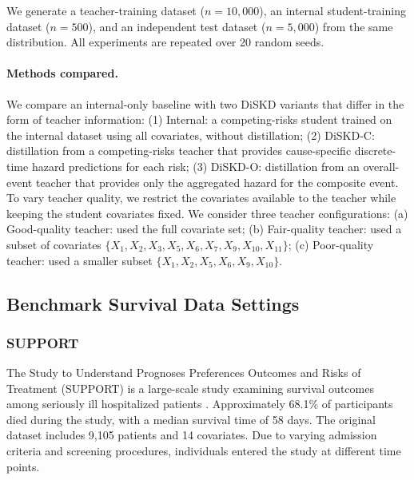 \documentclass{article}
\theoremstyle{plain}
\theoremstyle{definition}
\theoremstyle{remark}
\begin{document}
We generate a teacher-training dataset ($n=10{,}000$), an internal student-training dataset ($n=500$), and an independent test dataset ($n=5{,}000$) from the same distribution.
All experiments are repeated over 20 random seeds.


\paragraph{Methods compared.}
We compare an internal-only baseline with two DiSKD variants that differ in the form of teacher information:
    (1) Internal: a competing-risks student trained on the internal dataset using all covariates, without distillation;
    (2) DiSKD-C: distillation from a competing-risks teacher that provides cause-specific discrete-time hazard predictions for each risk;
    (3) DiSKD-O: distillation from an overall-event teacher that provides only the aggregated hazard for the composite event.
To vary teacher quality, we restrict the covariates available to the teacher while keeping the student covariates fixed.
We consider three teacher configurations:
    (a) Good-quality teacher: used the full covariate set;
    (b) Fair-quality teacher: used a subset of covariates $\{X_1, X_2, X_3, X_5, X_6, X_7, X_9, X_{10}, X_{11}\}$;
    (c) Poor-quality teacher: used a smaller subset $\{X_1, X_2, X_5, X_6, X_9, X_{10}\}$.


\subsection{Benchmark Survival Data Settings}
\label{A.BenchmarkSettings}

\subsubsection{SUPPORT}
The Study to Understand Prognoses Preferences Outcomes
and Risks of Treatment (SUPPORT) is a large-scale study examining survival outcomes among seriously ill hospitalized patients \citep{knaus1995support}. Approximately 68.1\% of participants died during the study, with a median survival time of 58 days. The original dataset includes 9,105 patients and 14 covariates. Due to varying admission criteria and screening procedures, individuals entered the study at different time points.
\end{document}
